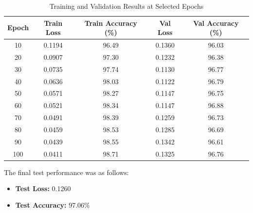 \documentclass{article}
\begin{document}
\begin{table}[htbp]
    \centering
    \label{tab:training-results}
    \renewcommand{\arraystretch}{1.2} %
    \begin{tabular}{|c|c|c|c|c|}
    \hline
    \textbf{Epoch} & \textbf{Train Loss} & \textbf{Train Accuracy (\%)} & \textbf{Val Loss} & \textbf{Val Accuracy (\%)} \\ \hline
    10             & 0.1194             & 96.49                        & 0.1360            & 96.03                       \\ \hline
    20             & 0.0907             & 97.30                        & 0.1232            & 96.38                       \\ \hline
    30             & 0.0735             & 97.74                        & 0.1130            & 96.77                       \\ \hline
    40             & 0.0636             & 98.03                        & 0.1122            & 96.79                       \\ \hline
    50             & 0.0571             & 98.27                        & 0.1147            & 96.75                       \\ \hline
    60             & 0.0521             & 98.34                        & 0.1147            & 96.88                       \\ \hline
    70             & 0.0491             & 98.39                        & 0.1259            & 96.73                       \\ \hline
    80             & 0.0459             & 98.53                        & 0.1285            & 96.69                       \\ \hline
    90             & 0.0439             & 98.55                        & 0.1342            & 96.61                       \\ \hline
    100            & 0.0411             & 98.71                        & 0.1325            & 96.76                       \\ \hline
    \end{tabular}
    \caption{Training and Validation Results at Selected Epochs}
\end{table}
    

The final test performance was as follows:
\begin{itemize}
    \item \textbf{Test Loss:} 0.1260
    \item \textbf{Test Accuracy:} 97.06\%
\end{itemize}
\end{document}
